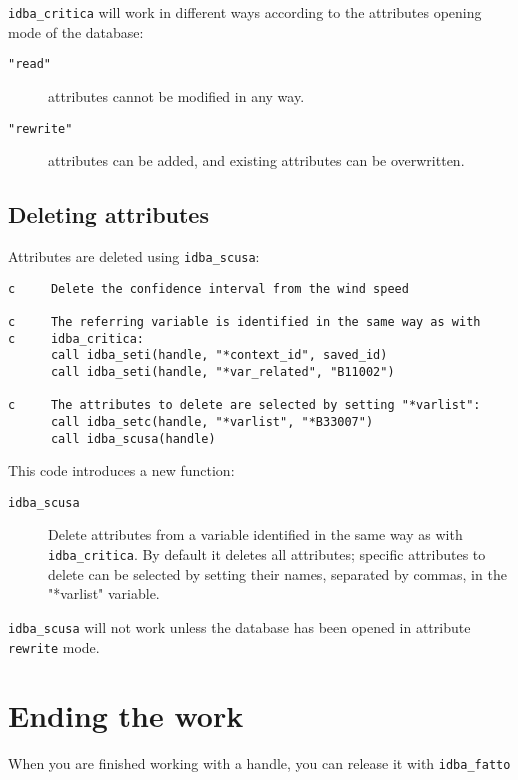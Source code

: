 \documentclass[final,12pt,a4paper,twoside]{book}
\begin{document}
{\tt idba\_critica} will work in different ways according to the attributes
opening mode of the database:

\begin{description}
\item[{\tt "read"}] attributes cannot be modified in any way.
\item[{\tt "rewrite"}] attributes can be added, and existing attributes can be
                   overwritten.
\end{description}


\subsection{Deleting attributes}

Attributes are deleted using {\tt idba\_scusa}:

\label{fun-idba_scusa}

\begin{verbatim}
c     Delete the confidence interval from the wind speed

c     The referring variable is identified in the same way as with
c     idba_critica:
      call idba_seti(handle, "*context_id", saved_id)
      call idba_seti(handle, "*var_related", "B11002")

c     The attributes to delete are selected by setting "*varlist":
      call idba_setc(handle, "*varlist", "*B33007")
      call idba_scusa(handle)
\end{verbatim}

This code introduces a new function:

\begin{description}
\item[{\tt idba\_scusa}]
  Delete attributes from a variable identified in the same way as with {\tt
  idba\_critica}.  By default it deletes all attributes; specific attributes to
  delete can be selected by setting their names, separated by commas, in the
  "*varlist" variable.
\end{description}

{\tt idba\_scusa} will not work unless the database has been opened in
attribute {\tt rewrite} mode.


\section{Ending the work}

When you are finished working with a handle, you can release it with {\tt idba\_fatto}
\end{document}
